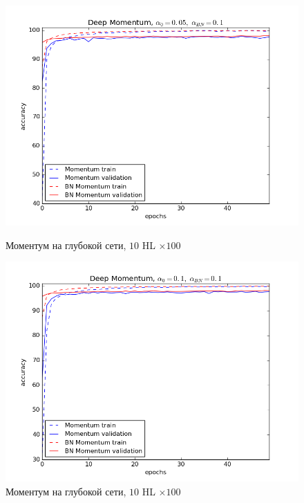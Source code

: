 \documentclass[12pt,oneside]{article}
\begin{document}
\begin{figure}[h!]
\begin{minipage}{0.45\textwidth}
\includegraphics[scale=0.45]{images/mnistDeepMomentum1.png}
\caption{\small Моментум на глубокой сети, $10$ HL $\times 100$}
\end{minipage} \hfill
\begin{minipage}{0.45\textwidth}
\includegraphics[scale=0.45]{images/mnistDeepMomentum2.png}
\caption{\small Моментум на глубокой сети, $10$ HL $\times 100$}
\end{minipage}
\end{figure}

\newpage
\end{document}
